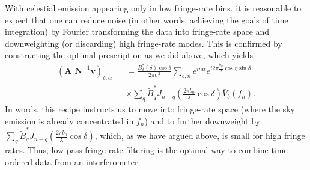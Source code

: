 \documentclass[twocolumn,apj,numberedappendix]{emulateapj}
\newcommand{\vis}{\mathbf{v}}
\newcommand{\A}{\mathbf{A}}
\newcommand{\N}{\mathbf{N}}
\begin{document}
With celestial emission appearing only in low fringe-rate bins, it is
reasonable to expect that one can reduce noise (in other words, achieving the
goals of time integration) by Fourier transforming the data into fringe-rate
space and downweighting (or discarding) high fringe-rate modes.  This is
confirmed by constructing the optimal prescription as we did above, which
yields
\begin{eqnarray}
\label{eq:AdagNinvv}
\left( \A^\dagger \N^{-1} \vis \right)_{\delta,\alpha} && = \frac{B_\delta^* (\delta)  \cos \delta}{2\pi \sigma^2} \sum_{b,n} e^{i n \alpha} e^{i 2 \pi  \frac{b_y}{\lambda} \cos \eta \sin \delta} \nonumber \\
&& \times \sum_{q} \widetilde{B}_q^* J_{n-q} \left( \frac{2 \pi b_0}{\lambda} \cos \delta \right) \overline{V}_b (f_n).
\end{eqnarray}
In words, this recipe instructs us to move into fringe-rate space (where the
sky emission is already concentrated in $f_n$) and to further downweight by
$\sum_{q} \widetilde{B}_q^* J_{n-q} \left( \frac{2 \pi b_0}{\lambda} \cos \delta \right)$, which, as we have argued above, is small for high fringe
rates.  Thus, low-pass fringe-rate filtering is the optimal way to combine
time-ordered data from an interferometer.
\end{document}
